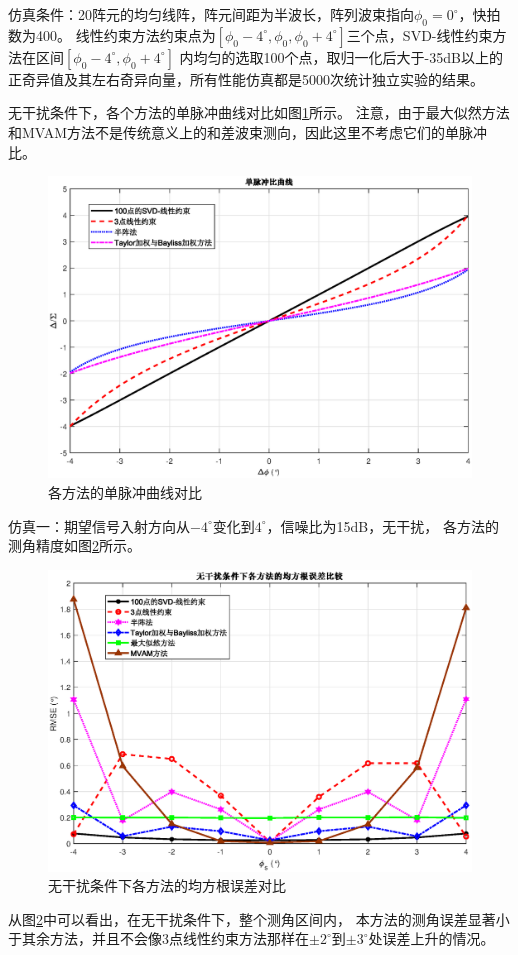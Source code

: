 \documentclass[master]{thesis-uestc}
\begin{document}
仿真条件：20阵元的均匀线阵，阵元间距为半波长，阵列波束指向$\phi_0=0^\circ$，快拍数为400。
线性约束方法约束点为$[\phi_0-4^\circ,\phi_0,\phi_0+4^\circ]$三个点，SVD-线性约束方法在区间$[\phi_0-4^\circ,\phi_0+4^\circ]$
内均匀的选取100个点，取归一化后大于-35dB以上的正奇异值及其左右奇异向量，所有性能仿真都是5000次统计独立实验的结果。

无干扰条件下，各个方法的单脉冲曲线对比如图\ref{SVD-JLC_MRC_cmp}所示。
注意，由于最大似然方法和MVAM方法不是传统意义上的和差波束测向，因此这里不考虑它们的单脉冲比。
\begin{figure}[H]
    \includegraphics[scale=0.5]{pic/SVD-JLC_MRC_cmp.eps}
    \caption{各方法的单脉冲曲线对比}
    \label{SVD-JLC_MRC_cmp}
\end{figure}

仿真一：期望信号入射方向从$-4^\circ$变化到$4^\circ$，信噪比为15dB，无干扰，
各方法的测角精度如图\ref{SVD-JLC_RMSE_jamming_free}所示。
\begin{figure}[H]
    \includegraphics[scale=0.5]{pic/SVD-JLC_RMSE_jamming_free.eps}
    \caption{无干扰条件下各方法的均方根误差对比}
    \label{SVD-JLC_RMSE_jamming_free}
\end{figure}
从图\ref{SVD-JLC_RMSE_jamming_free}中可以看出，在无干扰条件下，整个测角区间内，
本方法的测角误差显著小于其余方法，并且不会像3点线性约束方法那样在$\pm2^\circ$到$\pm3^\circ$处误差上升的情况。
\end{document}
